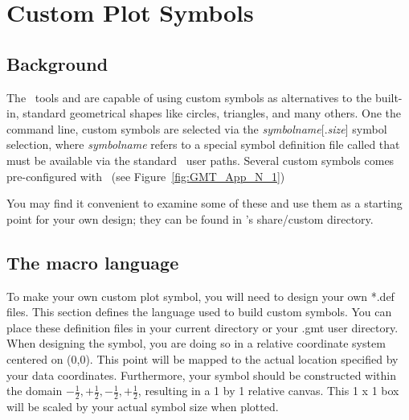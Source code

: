 %
%
\chapter{Custom Plot Symbols}
\label{app:N}
\thispagestyle{headings}

\section{Background}

The \GMT\ tools  and  are capable of using
custom symbols as alternatives to the built-in, standard geometrical shapes
like circles, triangles, and many others.  One the command line, custom
symbols are selected via the \emph{symbolname}[.\emph{size}] symbol
selection, where \emph{symbolname} refers to a special symbol definition
file called  that must be available via the standard
\GMT\ user paths.  Several custom symbols comes pre-configured with \GMT\
(see Figure~\ref{fig:GMT_App_N_1})


You may find it convenient to examine some of these and use them as a starting
point for your own design; they can be found in \GMT's share/custom directory.

% 
\section{The macro language}

To make your own custom plot symbol, you will need to design your own *.def files.
This section defines the language used to build custom symbols.  You can place these
definition files in your current directory or your .gmt user directory.  When designing
the symbol, you are doing so in a relative coordinate system centered on (0,0).  This point
will be mapped to the actual location specified by your data coordinates.  Furthermore,
your symbol should be constructed within the domain ${-\frac{1}{2},+\frac{1}{2},-\frac{1}{2},+\frac{1}{2}}$,
resulting in a 1 by 1 relative canvas.  This 1 x 1 box will be scaled by your actual
symbol size when plotted.

